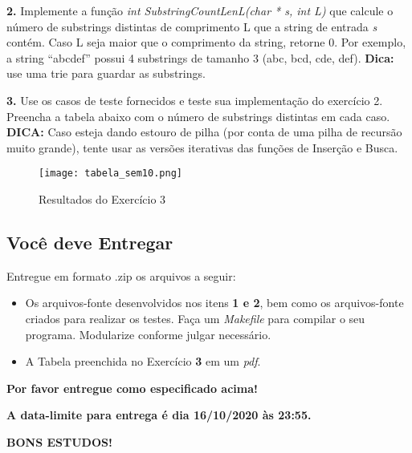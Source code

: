 \documentclass[]{article}
\providecommand{\tightlist}{%
  \setlength{\itemsep}{0pt}\setlength{\parskip}{0pt}}
\begin{document}
\textbf{2.} Implemente a função \emph{int SubstringCountLenL(char * s,
int L)} que calcule o número de substrings distintas de comprimento L
que a string de entrada \emph{s} contém. Caso L seja maior que o
comprimento da string, retorne 0. Por exemplo, a string ``abcdef''
possui 4 substrings de tamanho 3 (abc, bcd, cde, def). \textbf{Dica:}
use uma trie para guardar as substrings.

\textbf{3.} Use os casos de teste fornecidos e teste sua implementação
do exercício 2. Preencha a tabela abaixo com o número de substrings
distintas em cada caso. \textbf{DICA:} Caso esteja dando estouro de
pilha (por conta de uma pilha de recursão muito grande), tente usar as
versões iterativas das funções de Inserção e Busca.

\begin{figure}
\centering
\texttt{[image: tabela\_sem10.png]}
\caption{Resultados do Exercício 3}
\end{figure}

\hypertarget{vocuxea-deve-entregar}{%
\subsection{Você deve Entregar}\label{vocuxea-deve-entregar}}

Entregue em formato .zip os arquivos a seguir:

\begin{itemize}
\tightlist
\item
  Os arquivos-fonte desenvolvidos nos itens \textbf{1 e 2}, bem como os
  arquivos-fonte criados para realizar os testes. Faça um
  \emph{Makefile} para compilar o seu programa. Modularize conforme
  julgar necessário.
\item
  A Tabela preenchida no Exercício \textbf{3} em um \emph{pdf}.
\end{itemize}

\centering

\vspace{20pt}

\textbf{Por favor entregue como especificado acima!}

\vspace{50pt}

\textbf{A data-limite para entrega é dia 16/10/2020 às 23:55.}

\vspace{20pt}

\Large

\textbf{BONS ESTUDOS!}
\end{document}
